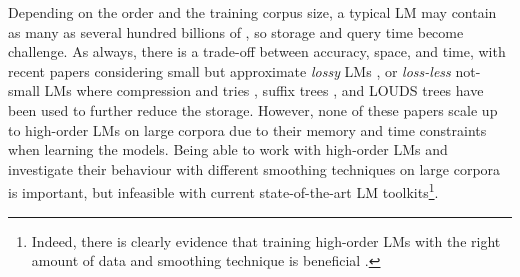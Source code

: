Depending on the order and the training corpus size, a typical \ngram LM may contain as many as several hundred billions of \ngrams \cite{brants2007large},
so storage and query time become challenge.
%
As always, there is a trade-off between accuracy, space, and time, with recent papers considering small but approximate  \emph{lossy} LMs 
\cite{Chazelle:2004:BFE:982792.982797,guthrie2010storing},
or \emph{loss-less}  not-small LMs \cite{stolcke2011srilm} where compression and tries 
\cite{Germann:2009:TPT:1621947.1621952,heafield2011kenlm,pauls2011faster}, 
suffix trees \cite{kennington2012suffix}, and LOUDS trees 
\cite{sall11,DBLP:conf/acl/WatanabeTI09}  
have been used to further reduce the storage.
However, none of these papers scale up to high-order  
\ngram LMs on large corpora due to their  memory and time constraints when learning the models.
%
% 
Being able to work with high-order  LMs and investigate their behaviour 
with different smoothing techniques on large corpora is important, but 
infeasible with current state-of-the-art LM toolkits\footnote{ 
Indeed, there is clearly evidence that training high-order \ngram
LMs with the right amount of data and smoothing technique is beneficial \cite{wood2011sequence}.
}. 

%
%
%
%
 
